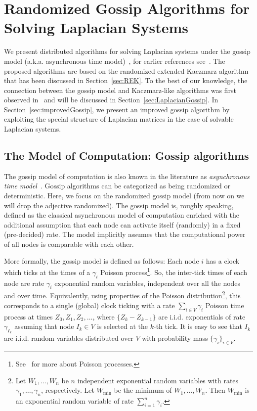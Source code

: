 \section{Randomized Gossip Algorithms for Solving Laplacian Systems}\label{sec:gossip}
We present distributed algorithms for solving Laplacian systems under the gossip model (a.k.a. asynchronous time model)~\cite{gossip:Boyd}, for earlier references see~\cite{gossip:TBA86,book:BT89}. The proposed algorithms are based on the randomized extended Kaczmarz algorithm that has been discussed in Section~\ref{sec:REK}. To the best of our knowledge, the connection between the gossip model and Kaczmarz-like algorithms was first observed in~\cite{CDC12} and will be discussed in Section~\ref{sec:LaplacianGossip}. In Section~\ref{sec:improvedGossip}, we present an improved gossip algorithm by exploiting the special structure of Laplacian matrices in the case of solvable Laplacian systems.
%
%
%
\subsection{The Model of Computation: Gossip algorithms}\label{sec:model}
The gossip model of computation is also known in the literature as \emph{asynchronous time model}~\cite{gossip:TBA86,book:BT89}. Gossip algorithms can be categorized as being randomized or deterministic. Here, we focus on the randomized gossip model (from now on we will drop the adjective randomized). The gossip model is, roughly speaking, defined as the classical asynchronous model of computation enriched with the additional assumption that each node can activate itself (randomly) in a fixed (pre-decided) rate. The model implicitly assumes that the computational power of all nodes is comparable with each other.
%

%
More formally, the gossip model is defined as follows: Each node $i$ has a clock which ticks at the times of a $\gamma_i$ Poisson process\footnote{See~\cite{book:Fellerv1} for more about Poisson processes.}. So, the inter-tick times of each node are rate $\gamma_i$ exponential random variables, independent over all the nodes and over time. Equivalently, using properties of the Poisson distribution\footnote{Let $W_1,\ldots ,W_n$ be $n$ independent exponential random variables with rates $\gamma_1,\ldots, \gamma_n$, respectively. Let $W_{\text{min}}$ be the minimum of $W_1,\ldots ,W_n$. Then $W_{\text{min}}$ is an exponential random variable of rate $\sum_{i=1}^{n} \gamma_i$.}, this corresponds to a single (global) clock ticking with a rate $\sum_{i\in V} \gamma_i$ Poisson time process at times $Z_0, Z_1, Z_2,\ldots$, where $\{Z_{k} - Z_{k-1}\}$ are i.i.d. exponentials of rate $\gamma_{I_k}$ assuming that node $I_k\in V$ is selected at the $k$-th tick. It is easy to see that $I_k$ are i.i.d. random variables distributed over $V$ with probability mass $\{\gamma_i\}_{i\in V}$.

